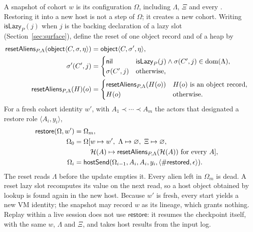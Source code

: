 A snapshot of cohort $w$ is its configuration $\Omega$, including $\Lambda$,
$\Xi$ and every .  Restoring it into a new host is not a step
of $\Omega$; it creates a new cohort.  Writing $\mathsf{isLazy}_P(j)$ when $j$
is the backing declaration of a lazy slot (Section~\ref{sec:surface}), define
the reset of one object record and of a heap by
\begin{equation}\label{eq:restore-lazy}
\begin{aligned}
 \mathsf{resetAliens}_{P,\Lambda}(\mathsf{object}\langle C,\sigma,\eta\rangle)
   &=\mathsf{object}\langle C,\sigma',\eta\rangle,\\
 \sigma'(C',j)
   &=\begin{cases}
  \mathsf{nil} & \mathsf{isLazy}_P(j)\land\sigma(C',j)\in\mathop{\mathrm{dom}}(\Lambda),\\
  \sigma(C',j) & \text{otherwise,}
 \end{cases}\\
 \mathsf{resetAliens}_{P,\Lambda}(H)(o)
   &=\begin{cases}
    \mathsf{resetAliens}_{P,\Lambda}(H(o)) & H(o)\text{ is an object record},\\
    H(o) & \text{otherwise.}
   \end{cases}
\end{aligned}
\end{equation}
For a fresh cohort identity $w'$, with $A_1\prec\cdots\prec A_m$ the actors
that designated a restore role $\langle A_i,y_i\rangle$,
\begin{equation}\label{eq:restore}
\begin{aligned}
 \mathsf{restore}(\Omega,w')&=\Omega_{m},\\
 \Omega_0&=\Omega[w\mapsto w',\ \Lambda\mapsto\varnothing,\
   \Xi\mapsto\varnothing,\\
 &\qquad\ \mathcal H(A)\mapsto\mathsf{resetAliens}_{P,\Lambda}(\mathcal H(A))
     \text{ for every }A],\\
 \Omega_{i}&=\mathsf{hostSend}(\Omega_{i-1},A_i,A_i,y_i,
   \langle\#\mathsf{restored},\epsilon\rangle).
\end{aligned}
\end{equation}
The reset reads $\Lambda$ before the update empties it.  Every alien left in
$\Omega_m$ is dead.  A reset lazy slot recomputes its value on the next read,
so a host object obtained by lookup is found again in the new host.  Because
$w'$ is fresh, every start yields a new VM identity; the snapshot may record
$w$ as its lineage, which grants nothing.  Replay within a live session does
not use $\mathsf{restore}$: it resumes the checkpoint itself, with the same
$w$, $\Lambda$ and $\Xi$, and takes host results from the input log.

